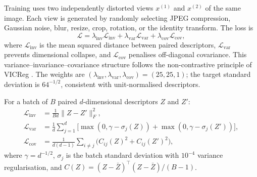 ﻿\documentclass[10pt,journal]{IEEEtran}
\begin{document}
Training uses two independently distorted views $x^{(1)}$ and $x^{(2)}$
of the same image. Each view is generated by randomly selecting JPEG
compression, Gaussian noise, blur, resize, crop, rotation, or the
identity transform. The loss is
\begin{equation}
\mathcal{L}=
\lambda_{\mathrm{inv}}\mathcal{L}_{\mathrm{inv}}+
\lambda_{\mathrm{var}}\mathcal{L}_{\mathrm{var}}+
\lambda_{\mathrm{cov}}\mathcal{L}_{\mathrm{cov}},
\label{eq:loss}
\end{equation}
where $\mathcal{L}_{\mathrm{inv}}$ is the mean squared distance between
paired descriptors, $\mathcal{L}_{\mathrm{var}}$ prevents dimensional
collapse, and $\mathcal{L}_{\mathrm{cov}}$ penalises off-diagonal
covariance. This variance--invariance--covariance structure follows the
non-contrastive principle of VICReg \cite{bardes2022vicreg}. The weights
are $(\lambda_{\mathrm{inv}},\lambda_{\mathrm{var}},\lambda_{\mathrm{cov}})
=(25,25,1)$; the target standard deviation is $64^{-1/2}$, consistent
with unit-normalised descriptors.

For a batch of $B$ paired $d$-dimensional descriptors $Z$ and $Z'$:
\begin{align}
\mathcal{L}_{\mathrm{inv}}&=\frac{1}{Bd}\lVert Z-Z'\rVert_F^2,\\
\mathcal{L}_{\mathrm{var}}&=\frac{1}{d}\sum_{j=1}^{d}
\bigl[\max(0,\gamma-\sigma_j(Z))+
\max(0,\gamma-\sigma_j(Z'))\bigr],\\
\mathcal{L}_{\mathrm{cov}}&=\frac{1}{d(d-1)}\sum_{i\ne j}
\bigl(C_{ij}(Z)^2+C_{ij}(Z')^2\bigr),
\end{align}
where $\gamma=d^{-1/2}$, $\sigma_j$ is the batch standard deviation
with $10^{-4}$ variance regularisation, and
$C(Z)=(Z-\bar Z)^\top(Z-\bar Z)/(B-1)$.
\end{document}

